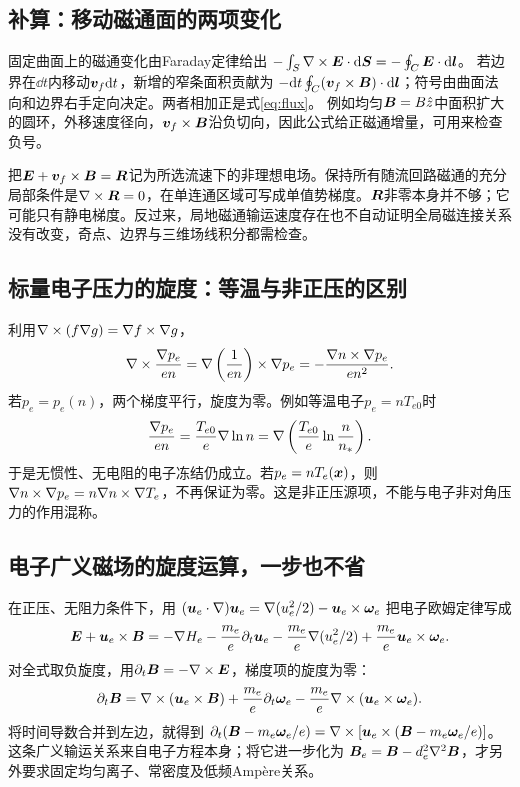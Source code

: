 \subsection{补算：移动磁通面的两项变化}
固定曲面上的磁通变化由Faraday定律给出
$-\int_S\nabla\times\bm{E}\cdot\mathrm d\bm{S}=-\oint_C\bm{E}\cdot\mathrm d\bm{l}$。
若边界在$\dd t$内移动$\bm{v}_f\mathrm d t$，新增的窄条面积贡献为
$-\mathrm d t\oint_C(\bm{v}_f\times\bm{B})\cdot\mathrm d\bm{l}$；符号由曲面法向和边界右手定向决定。两者相加正是式\eqref{eq:flux}。
例如均匀$\bm{B}=B\hat z$中面积扩大的圆环，外移速度径向，$\bm{v}_f\times\bm{B}$沿负切向，因此公式给正磁通增量，可用来检查负号。

把$\bm{E}+\bm{v}_f\times\bm{B}=\bm{R}$记为所选流速下的非理想电场。保持所有随流回路磁通的充分局部条件是$\nabla\times\bm{R}=0$，在单连通区域可写成单值势梯度。$\bm{R}$非零本身并不够；它可能只有静电梯度。反过来，局地磁通输运速度存在也不自动证明全局磁连接关系没有改变，奇点、边界与三维场线积分都需检查。

\subsection{标量电子压力的旋度：等温与非正压的区别}
利用$\nabla\times(f\nabla g)=\nabla f\times\nabla g$，
\begin{equation}
 \nabla\times{\nabla p_e\over en}
 =\nabla\left({1\over en}\right)\times\nabla p_e
 =-{\nabla n\times\nabla p_e\over en^2}.
\end{equation}
若$p_e=p_e(n)$，两个梯度平行，旋度为零。例如等温电子$p_e=nT_{e0}$时
\begin{equation}
 {\nabla p_e\over en}={T_{e0}\over e}\nabla\ln n
 =\nabla\left({T_{e0}\over e}\ln{n\over n_*}\right).
\end{equation}
于是无惯性、无电阻的电子冻结仍成立。若$p_e=nT_e(\bm{x})$，则
$\nabla n\times\nabla p_e=n\nabla n\times\nabla T_e$，不再保证为零。这是非正压源项，不能与电子非对角压力的作用混称。

\subsection{电子广义磁场的旋度运算，一步也不省}
在正压、无阻力条件下，用
$(\bm{u}_e\cdot\nabla)\bm{u}_e=\nabla(u_e^2/2)-\bm{u}_e\times\bm{\omega}_e$
把电子欧姆定律写成
\begin{equation}
 \bm{E}+\bm{u}_e\times\bm{B}
 =-\nabla H_e-{m_e\over e}\partial_t\bm{u}_e
 -{m_e\over e}\nabla(u_e^2/2)
 +{m_e\over e}\bm{u}_e\times\bm{\omega}_e.
\end{equation}
对全式取负旋度，用$\partial_t\bm{B}=-\nabla\times\bm{E}$，梯度项的旋度为零：
\begin{equation}
 \partial_t\bm{B}
 =\nabla\times(\bm{u}_e\times\bm{B})
 +{m_e\over e}\partial_t\bm{\omega}_e
 -{m_e\over e}\nabla\times(\bm{u}_e\times\bm{\omega}_e).
\end{equation}
将时间导数合并到左边，就得到
$\partial_t(\bm{B}-m_e\bm{\omega}_e/e)=
\nabla\times[\bm{u}_e\times(\bm{B}-m_e\bm{\omega}_e/e)]$。
这条广义输运关系来自电子方程本身；将它进一步化为
$\bm{B}_e=\bm{B}-d_e^2\nabla^2\bm{B}$，才另外要求固定均匀离子、常密度及低频Ampère关系。

